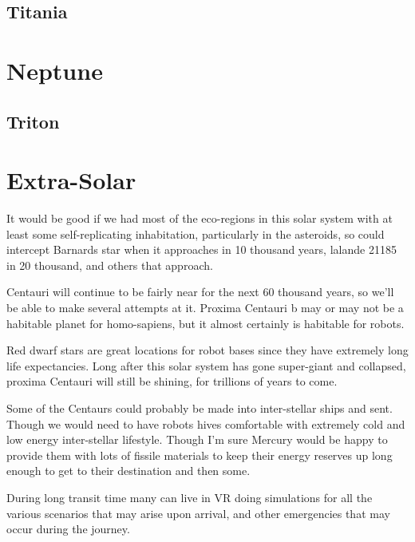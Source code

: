 \subsection{Titania}

\section{Neptune}
\subsection{Triton}


\section{Extra-Solar}

It would be good if we had most of the eco-regions in this solar system with at
least some self-replicating inhabitation, particularly in the asteroids, so
could intercept Barnards star when it approaches in 10 thousand years, lalande
21185 in 20 thousand, and others that approach. 

Centauri will continue to be fairly near for the next 60 thousand
years, so we'll be able to make several attempts at it.  Proxima Centauri b may
or may not be a habitable planet for homo-sapiens, but it almost certainly is
habitable for robots. 

Red dwarf stars are great locations for robot bases since they have extremely
long life expectancies. Long after this solar system has gone super-giant and
collapsed, proxima Centauri will still be shining, for trillions of
years to come. 


Some of the Centaurs could probably be made into inter-stellar ships and sent.
Though we would need to have robots hives comfortable with extremely cold and
low energy inter-stellar lifestyle. Though I'm sure Mercury would be happy to
provide them with lots of fissile materials to keep their energy reserves up
long enough to get to their destination and then some. 

During long transit time many can live in VR doing simulations for all the
various scenarios that may arise upon arrival, and other emergencies that may
occur during the journey. 

